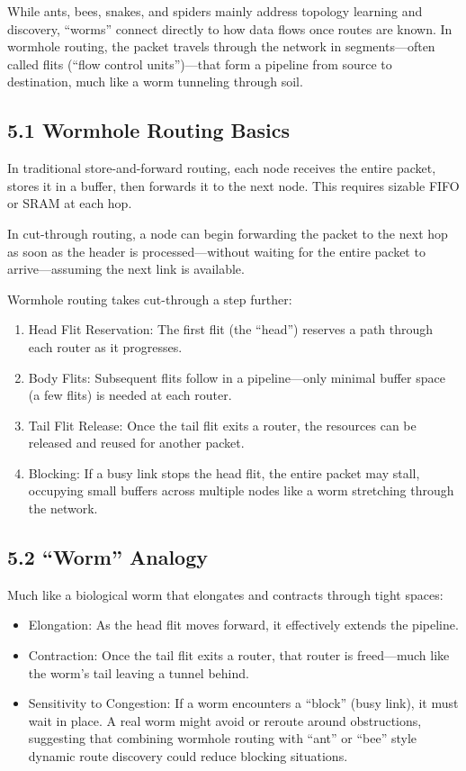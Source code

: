 \documentclass[../OAE-SPEC-MAIN.tex]{subfiles}
\begin{document}
While ants, bees, snakes, and spiders mainly address topology learning and discovery, “worms” connect directly to how data flows once routes are known. In wormhole routing, the packet travels through the network in segments—often called flits (“flow control units”)—that form a pipeline from source to destination, much like a worm tunneling through soil.

\subsection{5.1 Wormhole Routing Basics}

In traditional store-and-forward routing, each node receives the entire packet, stores it in a buffer, then forwards it to the next node. This requires sizable FIFO or SRAM at each hop.

In cut-through routing, a node can begin forwarding the packet to the next hop as soon as the header is processed—without waiting for the entire packet to arrive—assuming the next link is available.

Wormhole routing takes cut-through a step further:
\begin{enumerate}
	\item  Head Flit Reservation: The first flit (the “head”) reserves a path through each router as it progresses.
	\item  Body Flits: Subsequent flits follow in a pipeline—only minimal buffer space (a few flits) is needed at each router.
	\item  Tail Flit Release: Once the tail flit exits a router, the resources can be released and reused for another packet.
	\item  Blocking: If a busy link stops the head flit, the entire packet may stall, occupying small buffers across multiple nodes like a worm stretching through the network.
\end{enumerate}




\subsection{5.2 “Worm” Analogy}

Much like a biological worm that elongates and contracts through tight spaces:
\begin{itemize}
	\item Elongation: As the head flit moves forward, it effectively extends the pipeline.
	\item Contraction: Once the tail flit exits a router, that router is freed—much like the worm’s tail leaving a tunnel behind.
	\item Sensitivity to Congestion: If a worm encounters a “block” (busy link), it must wait in place. A real worm might avoid or reroute around obstructions, suggesting that combining wormhole routing with “ant” or “bee” style dynamic route discovery could reduce blocking situations.
\end{itemize}
\end{document}
